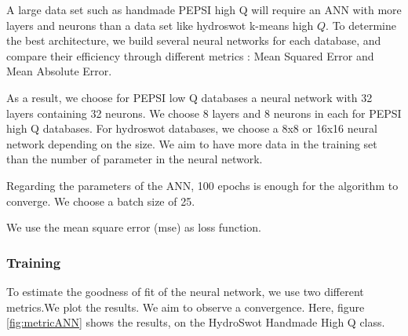 A large data set such as handmade PEPSI high Q will require an ANN with more layers and neurons than a data set like hydroswot k-means high $Q$. To determine the best architecture, we build several neural networks for each database, and compare their efficiency through different metrics : Mean Squared Error and Mean Absolute Error.

As a result, we choose for PEPSI low Q databases a neural network with 32 layers containing 32 neurons. We choose 8 layers and 8 neurons in each for PEPSI high Q databases. For hydroswot databases, we choose a 8x8 or 16x16 neural network depending on the size. We aim to have more data in the training set than the number of parameter in the neural network.

Regarding the parameters of the ANN, 100 epochs is enough for the algorithm to converge. We choose a batch size of 25.

We use the mean square error (mse) as loss function. 

\subsubsection{Training}

To estimate the goodness of fit of the neural network, we use two different metrics.We plot the results. We aim to observe a convergence.  Here, figure \ref{fig:metricANN} shows the results, on the HydroSwot  Handmade High Q class.


